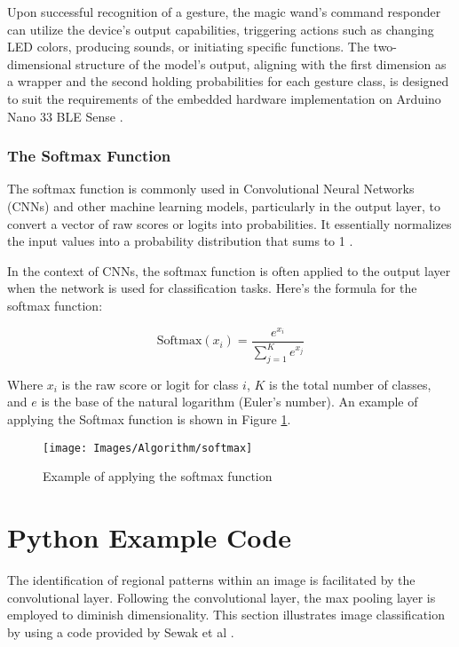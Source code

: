 Upon successful recognition of a gesture, the magic wand's command responder can utilize the device's output capabilities, triggering actions such as changing LED colors, producing sounds, or initiating specific functions. The two-dimensional structure of the model's output, aligning with the first dimension as a wrapper and the second holding probabilities for each gesture class, is designed to suit the requirements of the embedded hardware implementation on Arduino Nano 33 BLE Sense \cite{Zhu:2019}.

\subsubsection{The Softmax Function}
\label{Softmax Function}
The softmax function is commonly used in Convolutional Neural Networks (CNNs) and other machine learning models, particularly in the output layer, to convert a vector of raw scores or logits into probabilities. It essentially normalizes the input values into a probability distribution that sums to 1 \cite{Sewak:2018}.

In the context of CNNs, the softmax function is often applied to the output layer when the network is used for classification tasks. Here's the formula for the softmax function:

\begin{equation}
	\text{Softmax}(x_i) = \frac{e^{x_i}}{\sum_{j=1}^{K} e^{x_j}}
\end{equation}

Where \( x_i \) is the raw score or logit for class \( i \), \( K \) is the total number of classes, and \( e \) is the base of the natural logarithm (Euler's number). An example of applying the Softmax function is shown in Figure \ref{fig:softmax}.

\begin{figure}[h!]
	\centering
	\texttt{[image: Images/Algorithm/softmax]}
	\caption{Example of applying the softmax function \cite{Sewak:2018}} \label{fig:softmax}
\end{figure}

\section{Python Example Code}
\label{section:AlgorithmExampleCode}


The identification of regional patterns within an image is facilitated by the convolutional layer. Following the convolutional layer, the max pooling layer is employed to diminish dimensionality. This section illustrates image classification by using a code provided by Sewak et al \cite{Sewak:2018}.

